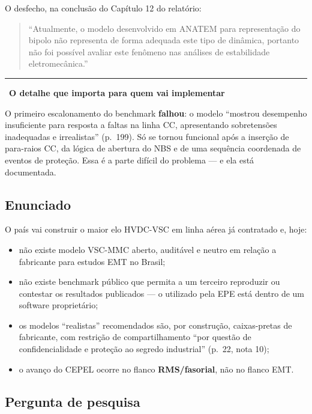 \documentclass[12pt,a4paper]{article}
\newenvironment{citacao}
  {\begin{quote}\singlespacing\small\setlength{\leftskip}{2.5cm}\noindent}
  {\par\end{quote}}
\newcommand{\fonte}[1]{\par\vspace{2pt}\noindent{\footnotesize\textcolor{gray}{#1}}}
\newenvironment{destaque}[1]
  {\par\vspace{6pt}\begin{list}{}{%
     \setlength{\leftmargin}{0.8cm}\setlength{\rightmargin}{0cm}%
     \setlength{\labelwidth}{0pt}\setlength{\labelsep}{0pt}}%
   \item[]\textcolor{acento}{\rule[-1pt]{2pt}{10pt}}\ \textbf{#1}\par\vspace{2pt}\small}
  {\end{list}\vspace{6pt}}
\begin{document}
O desfecho, na conclusão do Capítulo 12 do relatório:

\begin{citacao}
\enquote{Atualmente, o modelo desenvolvido em ANATEM para representação do bipolo não representa de
forma adequada este tipo de dinâmica, portanto não foi possível avaliar este fenômeno nas análises
de estabilidade eletromecânica.}
\fonte{EPE-DEE-RE-071/2025-rev0, p.~203.}
\end{citacao}

\begin{destaque}{O detalhe que importa para quem vai implementar}
O primeiro escalonamento do benchmark \textbf{falhou}: o modelo \enquote{mostrou desempenho
insuficiente para resposta a faltas na linha CC, apresentando sobretensões inadequadas e
irrealistas} (p.~199). Só se tornou funcional após a inserção de para-raios CC, da lógica de
abertura do NBS e de uma sequência coordenada de eventos de proteção. Essa é a parte difícil do
problema --- e ela está documentada.
\end{destaque}

\subsection{Enunciado}

O país vai construir o maior elo HVDC-VSC em linha aérea já contratado e, hoje:

\begin{itemize}
  \item não existe modelo VSC-MMC aberto, auditável e neutro em relação a fabricante para estudos
        EMT no Brasil;
  \item não existe benchmark público que permita a um terceiro reproduzir ou contestar os
        resultados publicados --- o utilizado pela EPE está dentro de um software proprietário;
  \item os modelos \enquote{realistas} recomendados são, por construção, caixas-pretas de
        fabricante, com restrição de compartilhamento \enquote{por questão de confidencialidade e
        proteção ao segredo industrial} (p.~22, nota 10);
  \item o avanço do CEPEL ocorre no flanco \textbf{RMS/fasorial}, não no flanco EMT.
\end{itemize}

\subsection{Pergunta de pesquisa}
\end{document}
